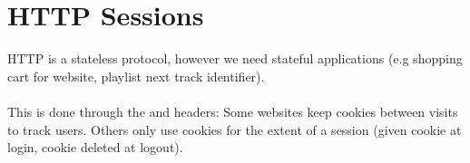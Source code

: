 \documentclass{report}
\begin{document}
    
    \section*{HTTP Sessions}
        HTTP is a stateless protocol, however we need stateful applications (e.g shopping cart for website, playlist next track identifier).
        \\
        \\ This is done through the  and  headers:
        Some websites keep cookies between visits to track users. Others only use cookies for the extent of a session (given cookie at login, cookie deleted at logout).
\end{document}

